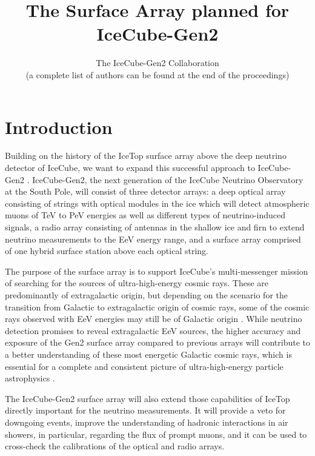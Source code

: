 \documentclass[a4paper,11pt]{article}
\title{The Surface Array planned for IceCube-Gen2}
\author{The IceCube-Gen2 Collaboration \\{\normalsize \normalfont(a complete list of authors can be found at the end of the proceedings)}}
\begin{document}
\maketitle


\section{Introduction}
Building on the history of the IceTop surface array above the deep neutrino detector of IceCube, we want to expand this successful approach to IceCube-Gen2 \cite{Aartsen:2020fgd}.
IceCube-Gen2, the next generation of the IceCube Neutrino Observatory at the South Pole, will consist of three detector arrays: a deep optical array consisting of strings with optical modules in the ice which will detect atmospheric muons of TeV to PeV energies as well as different types of neutrino-induced signals, a radio array consisting of antennas in the shallow ice and firn to extend neutrino measurements to the EeV energy range, and a surface array comprised of one hybrid surface station above each optical string.

The purpose of the surface array is to support IceCube's multi-messenger mission of searching for the sources of ultra-high-energy cosmic rays. 
These are predominantly of extragalactic origin, but depending on the scenario for the transition from Galactic to extragalactic origin of cosmic rays, some of the cosmic rays observed with EeV energies may still be of Galactic origin \cite{Aab:2020rhr, Aab:2020xgf, Mollerach:2017idb}. 
While neutrino detection promises to reveal extragalactic EeV sources, the higher accuracy and exposure of the Gen2 surface array compared to previous arrays will contribute to a better understanding of these most energetic Galactic cosmic rays, which is essential for a complete and consistent picture of ultra-high-energy particle astrophysics \cite{Schroeder:2019TB, Astro2020_GCR_WhitePaper}. 

The IceCube-Gen2 surface array will also extend those capabilities of IceTop directly important for the neutrino measurements.
It will provide a veto for downgoing events, improve the understanding of hadronic interactions in air showers, in particular, regarding the flux of prompt muons, and it can be used to cross-check the calibrations of the optical and radio arrays. 
\end{document}
